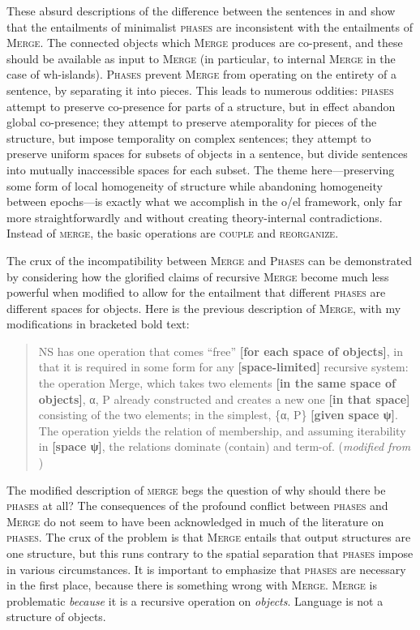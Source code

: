     These absurd descriptions of the difference between the sentences in  and  show that the entailments of minimalist \textsc{phases} are inconsistent with the entailments of \textsc{Merge}. The connected objects which \textsc{Merge} produces are co-present, and these should be available as input to \textsc{Merge} (in particular, to internal \textsc{Merge} in the case of wh-islands). \textsc{Phases} prevent \textsc{Merge} from operating on the entirety of a sentence, by separating it into pieces. This leads to numerous oddities: \textsc{phases} attempt to preserve co-presence for parts of a structure, but in effect abandon global co-presence; they attempt to preserve atemporality for pieces of the structure, but impose temporality on complex sentences; they attempt to preserve uniform spaces for subsets of objects in a sentence, but divide sentences into mutually inaccessible spaces for each subset. The theme here—preserving some form of local homogeneity of structure while abandoning homogeneity between epochs—is exactly what we accomplish in the o/el framework, only far more straightforwardly and without creating theory-internal contradictions. Instead of \textsc{merge}, the basic operations are \textsc{couple} and \textsc{reorganize}.

  The crux of the incompatibility between \textsc{Merge} and \textsc{Phases} can be demonstrated by considering how the glorified claims of recursive \textsc{Merge} become much less powerful when modified to allow for the entailment that different \textsc{phases} are different spaces for objects. Here is the previous description of \textsc{Merge}, with my modifications in bracketed bold text:

\begin{quote} 
NS has one operation that comes “free” \textbf{[for each space of objects]}, in that it is required in some form for any \textbf{[space-limited]} recursive system: the operation Merge, which takes two elements \textbf{[in the same space of objects]}, α, P already constructed and creates a new one \textbf{[in that space]} consisting of the two elements; in the simplest, \{α, P\} \textbf{[given space ψ]}. The operation yields the relation of membership, and assuming iterability in \textbf{[space ψ]}, the relations dominate (contain) and term-of. (\textit{modified from} \citealt{Chomsky2001})
\end{quote}

  The modified description of \textsc{merge} begs the question of why should there be \textsc{phases} at all? The consequences of the profound conflict between \textsc{phases} and \textsc{Merge} do not seem to have been acknowledged in much of the literature on \textsc{phases}. The crux of the problem is that \textsc{Merge} entails that output structures are one structure, but this runs contrary to the spatial separation that \textsc{phases} impose in various circumstances. It is important to emphasize that \textsc{phases} are necessary in the first place, because there is something wrong with \textsc{Merge}. \textsc{Merge} is problematic \textit{because} it is a recursive operation on \textit{objects}. Language is not a structure of objects.

